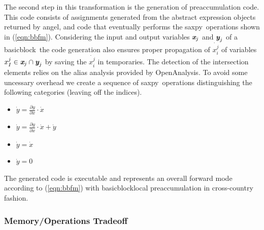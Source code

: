 \documentclass[acmtocl,acmnow]{acmtrans2m}
\newcommand{\angel}{angel}
\newcommand{\basicblock}{basicblock}
\newcommand{\OpenAnalysis}{OpenAnalysis}
\newcommand{\saxpy}{saxpy}
\newcommand{\bmx}{\mbox{\bf\em x}}
\newcommand{\bmy}{\mbox{\bf\em y}}
\newcommand{\refeqn}[1]{(\ref{#1})}
\begin{document}
The second step in this transformation is the generation of preaccumulation code. 
This code consists of assignments generated from  the abstract expression objects returned by \angel, 
and code that eventually performs the \saxpy\ operations shown in \refeqn{eqn:bbfm}. 
Considering the input and output variables $\bmx_j$ and $\bmy_j$ of a \basicblock\ the code generation 
also ensures proper propagation of $\dot{x_i^j}$ of variables $ x_I^j \in  \bmx_j \cap \bmy_j$ 
by saving the $\dot{x_i^j}$ in temporaries.
The detection of the intersection elements relies on the alias analysis provided by 
\OpenAnalysis.
To avoid some uncessary overhead 
we create a sequence of \saxpy\ operations distinguishing the following categories (leaving off 
the indices). 
\begin{itemize}
\item $\dot{y} = \frac{\partial y }{\partial x }\cdot \dot{x}$
\item $\dot{y} = \frac{\partial y }{\partial x }\cdot \dot{x} + \dot{y}$
\item $\dot{y} = \dot{x}$
\item $\dot{y} = 0$	
\end{itemize}

The generated code is executable and represents an overall forward mode 
according to \refeqn{eqn:bbfm} with \basicblock\-local preaccumulation in 
cross-country fashion. 

\subsubsection{Memory/Operations Tradeoff}\label{sssec:MMTradeOff}
\end{document}
